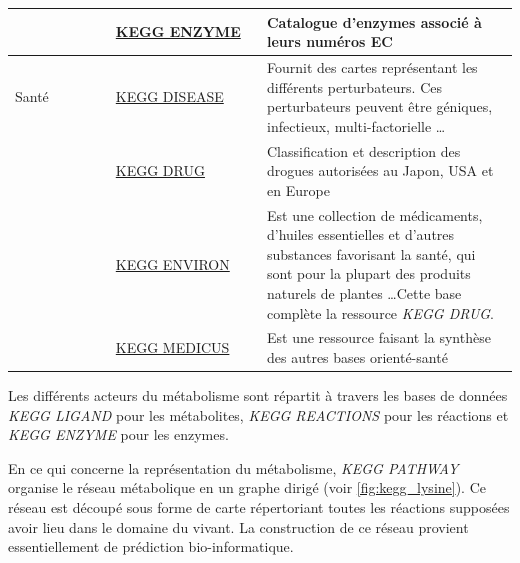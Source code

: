 \begin{refsegment}
\begin{table}[H]
\begin{tabular}{p{0.2\linewidth}|p{0.3\linewidth}|p{0.5\linewidth}}
            \cline{2-3}             & \href{http://www.genome.jp/kegg/annotation/enzyme.html}{KEGG ENZYME}  & Catalogue d'enzymes associé à leurs numéros \acrfull{EC}\\
            \hline
            Santé                   & \href{http://www.genome.jp/kegg/disease/}{KEGG DISEASE}               & Fournit des cartes représentant les différents perturbateurs. Ces perturbateurs peuvent être géniques, infectieux, multi-factorielle \ldots\\
            \cline{2-3}             & \href{http://www.genome.jp/kegg/drug/}{KEGG DRUG}                     & Classification et description des drogues autorisées au Japon, USA et en Europe\\
            \cline{2-3}             & \href{http://www.genome.jp/kegg/drug/environ.html}{KEGG ENVIRON}      & Est une collection de médicaments, d'huiles essentielles et d'autres substances favorisant la santé, qui sont pour la plupart des produits naturels de plantes \ldots Cette base complète la ressource \textit{KEGG DRUG}.\\
            \cline{2-3}             & \href{http://www.genome.jp/kegg/medicus.html}{KEGG MEDICUS}           & Est une ressource faisant la synthèse des autres  bases orienté-santé \\
            \bottomrule
        \end{tabular}
    \end{table}
    
    
    Les différents acteurs du métabolisme sont répartit à travers les bases de données \textit{KEGG LIGAND} pour les métabolites, \textit{KEGG REACTIONS} pour les réactions et \textit{KEGG ENZYME} pour les enzymes.
    
    En ce qui concerne la représentation du métabolisme, \textit{KEGG PATHWAY} organise le réseau métabolique en un graphe dirigé (voir \cref{fig:kegg_lysine}). Ce réseau est découpé sous forme de carte répertoriant toutes les réactions supposées avoir lieu dans le domaine du vivant. La construction de ce réseau provient essentiellement de prédiction bio-informatique.
    

\end{refsegment}
